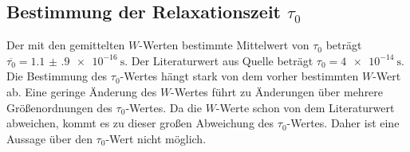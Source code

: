 \subsection{Bestimmung der Relaxationszeit \texorpdfstring{$\tau_{0}$}{T1}}
Der mit den gemittelten $W$-Werten bestimmte Mittelwert von $\tau_0$ beträgt\\ $\overline{\tau_{0}} = \SI{1.1(9)e-16}{\second}$.
Der Literaturwert aus Quelle \cite{Muccillo} beträgt $\tau_0=\SI{4e-14}{\second}$. 
Die Bestimmung des $\tau_0$-Wertes 
hängt stark von dem vorher bestimmten $W$-Wert ab. Eine geringe Änderung des $W$-Wertes führt zu Änderungen über 
mehrere Größenordnungen des $\tau_0$-Wertes. Da die $W$-Werte schon von dem Literaturwert abweichen, kommt es zu 
dieser großen Abweichung des $\tau_0$-Wertes. Daher ist eine Aussage über den $\tau_0$-Wert nicht möglich.

\newpage

